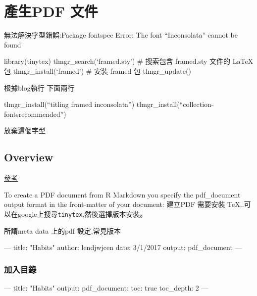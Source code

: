 \documentclass[]{book}
\newenvironment{Shaded}{\begin{snugshade}}{\end{snugshade}}
\newcommand{\AttributeTok}[1]{\textcolor[rgb]{0.77,0.63,0.00}{#1}}
\newcommand{\FunctionTok}[1]{\textcolor[rgb]{0.00,0.00,0.00}{#1}}
\newcommand{\OtherTok}[1]{\textcolor[rgb]{0.56,0.35,0.01}{#1}}
\newcommand{\StringTok}[1]{\textcolor[rgb]{0.31,0.60,0.02}{#1}}
\theoremstyle{definition}
\theoremstyle{definition}
\theoremstyle{definition}
\theoremstyle{remark}
\begin{document}
\hypertarget{pdf-}{%
\section{產生PDF 文件}\label{pdf-}}

無法解決字型錯誤:Package fontspec Error: The font ``Inconsolata'' cannot
be found

library(tinytex) tlmgr\_search(`framed.sty') \# 搜索包含 framed.sty
文件的 LaTeX 包 tlmgr\_install(`framed') \# 安装 framed 包
tlmgr\_update()

根據blog執行 下面兩行

tlmgr\_install(``titling framed inconsolata'')
tlmgr\_install(``collection-fontsrecommended'')

放棄這個字型

\hypertarget{overview}{%
\subsection{Overview}\label{overview}}

\href{https://rmarkdown.rstudio.com/pdf_document_format}{參考}

To create a PDF document from R Markdown you specify the pdf\_document
output format in the front-matter of your document: 建立PDF 需要安裝
TeX..可以在google上搜尋\texttt{tinytex},然後選擇版本安裝。

所謂meta data 上的pdf 設定,常見版本

\begin{Shaded}
\begin{Highlighting}[]
\OtherTok{---}
\FunctionTok{title:}\AttributeTok{ }\StringTok{"Habits"}
\FunctionTok{author:}\AttributeTok{ lendjwjcen }
\FunctionTok{date:}\AttributeTok{ 3/1/2017}
\FunctionTok{output:}\AttributeTok{ pdf_document}
\OtherTok{---}
\end{Highlighting}
\end{Shaded}

\subsubsection{加入目錄}

\begin{Shaded}
\begin{Highlighting}[]
\OtherTok{---}
\FunctionTok{title:}\AttributeTok{ }\StringTok{"Habits"}
\FunctionTok{output:}
  \FunctionTok{pdf_document:}
    \FunctionTok{toc:}\AttributeTok{ true}
    \FunctionTok{toc_depth:}\AttributeTok{ 2}
\OtherTok{---}
\end{Highlighting}
\end{Shaded}
\end{document}
